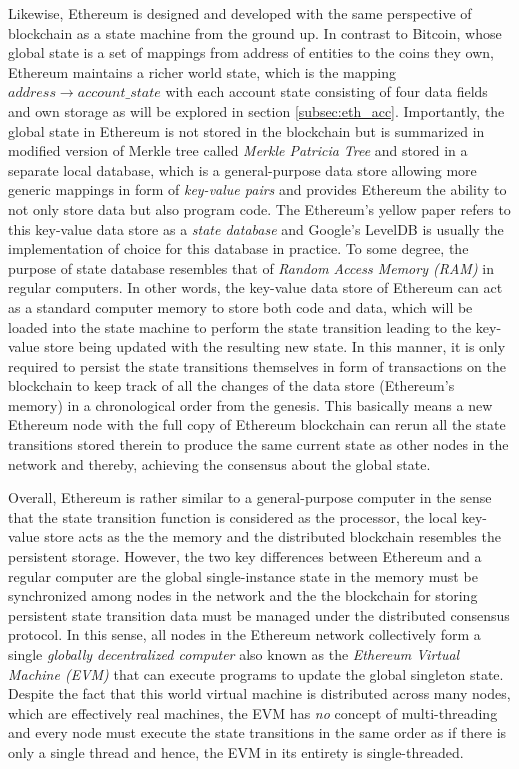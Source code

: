 Likewise, Ethereum is designed and developed with the same perspective of blockchain as a state machine from the ground up. In contrast to Bitcoin, whose global state is a set of mappings from address of entities to the coins they own, Ethereum maintains a richer world state, which is the mapping $address \rightarrow account\_state$ with each account state consisting of four data fields and own storage as will be explored in section \ref{subsec:eth_acc}. Importantly, the global state in Ethereum is not stored in the blockchain but is summarized in modified version of Merkle tree called \textit{Merkle Patricia Tree} and stored in a separate local database, which is a general-purpose data store allowing more generic mappings in form of \textit{key-value pairs} and provides Ethereum the ability to not only store data but also program code. The Ethereum's yellow paper refers to this key-value data store as a \textit{state database} \cite{wood2014ethereum} and Google's LevelDB is usually the implementation of choice for this database in practice. To some degree, the purpose of state database resembles that of \textit{Random Access Memory (RAM)} in regular computers. In other words, the key-value data store of Ethereum can act as a standard computer memory to store both code and data, which will be loaded into the state machine to perform the state transition leading to the key-value store being updated with the resulting new state. In this manner, it is only required to persist the state transitions themselves in form of transactions on the blockchain to keep track of all the changes of the data store (Ethereum's memory) in a chronological order from the genesis. This basically means a new Ethereum node with the full copy of Ethereum blockchain can rerun all the state transitions stored therein to produce the same current state as other nodes in the network and thereby, achieving the consensus about the global state. 

Overall, Ethereum is rather similar to a general-purpose computer in the sense that the state transition function is considered as the processor, the local key-value store acts as the the memory and the distributed blockchain resembles the persistent storage. However, the two key differences between Ethereum and a regular computer are the global single-instance state in the memory must be synchronized among nodes in the network and the the blockchain for storing persistent state transition data must be managed under the distributed consensus protocol. In this sense, all nodes in the Ethereum network collectively form a single \textit{globally decentralized computer} also known as the \textit{Ethereum Virtual Machine (EVM)} that can execute programs to update the global singleton state. Despite the fact that this world virtual machine is distributed across many nodes, which are effectively real machines, the EVM has \textit{no} concept of multi-threading and every node must execute the state transitions in the same order as if there is only a single thread and hence, the EVM in its entirety is single-threaded.

